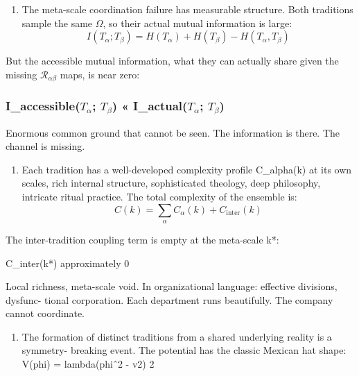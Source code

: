 \documentclass[
]{article}
\providecommand{\tightlist}{%
  \setlength{\itemsep}{0pt}\setlength{\parskip}{0pt}}
\begin{document}
\begin{enumerate}
\def\labelenumi{\arabic{enumi}.}
\setcounter{enumi}{8}
\tightlist
\item
  The meta-scale coordination failure has measurable structure. Both
  traditions sample the same \(\Omega\), so their actual mutual
  information is large:
  \[I(T_\alpha; T_\beta) = H(T_\alpha) + H(T_\beta) - H(T_\alpha, T_\beta)\]
\end{enumerate}

But the accessible mutual information, what they can actually share
given the missing \(\mathcal{R}_{\alpha\beta}\) maps, is near zero:

\subsubsection{\texorpdfstring{I\_accessible(\(T_\alpha\); \(T_\beta\))
« I\_actual(\(T_\alpha\);
\(T_\beta\))}{I\_accessible(T\_\textbackslash alpha; T\_\textbackslash beta) « I\_actual(T\_\textbackslash alpha; T\_\textbackslash beta)}}\label{i_accessiblet_alpha-t_beta-i_actualt_alpha-t_beta}

Enormous common ground that cannot be seen. The information is there.
The channel is missing.

\begin{enumerate}
\def\labelenumi{\arabic{enumi}.}
\setcounter{enumi}{9}
\tightlist
\item
  Each tradition has a well-developed complexity profile C\_alpha(k) at
  its own scales, rich internal structure, sophisticated theology, deep
  philosophy, intricate ritual practice. The total complexity of the
  ensemble is:
  \[C(k) = \sum_\alpha C_\alpha(k) + C_{\mathrm{inter}}(k)\]
\end{enumerate}

The inter-tradition coupling term is empty at the meta-scale k*:

C\_inter(k*) approximately 0

Local richness, meta-scale void. In organizational language: effective
divisions, dysfunc- tional corporation. Each department runs
beautifully. The company cannot coordinate.

\begin{enumerate}
\def\labelenumi{\arabic{enumi}.}
\setcounter{enumi}{10}
\tightlist
\item
  The formation of distinct traditions from a shared underlying reality
  is a symmetry- breaking event. The potential has the classic Mexican
  hat shape: V(phi) = lambda(\textbar phi\textbar ˆ2 - v2) 2
\end{enumerate}
\end{document}
